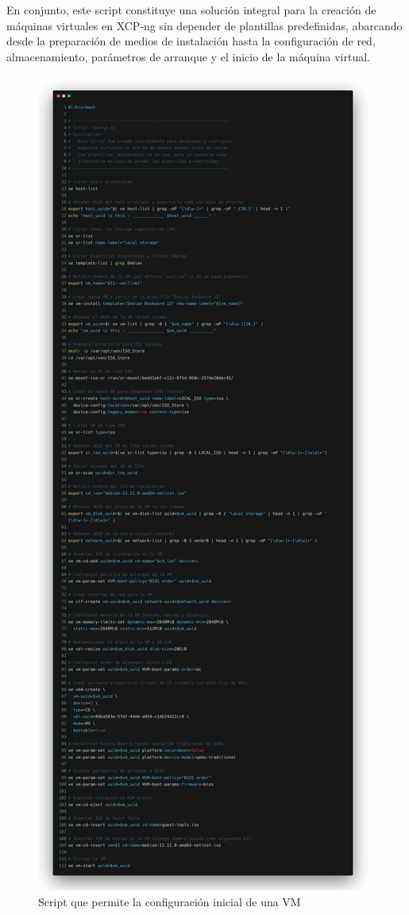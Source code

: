 En conjunto, este script constituye una solución integral para la creación de máquinas virtuales en XCP-ng sin depender de plantillas predefinidas, abarcando desde la preparación de medios de instalación hasta la configuración de red, almacenamiento, parámetros de arranque y el inicio de la máquina virtual.

\begin{figure}[H]
    \centering
    \includegraphics[scale=0.2]{tablas-images/cp6/src/bootup-vm.png}
    \caption{Script que permite la configuración inicial de una VM}\label{fig:bootup-vm}
\end{figure}
